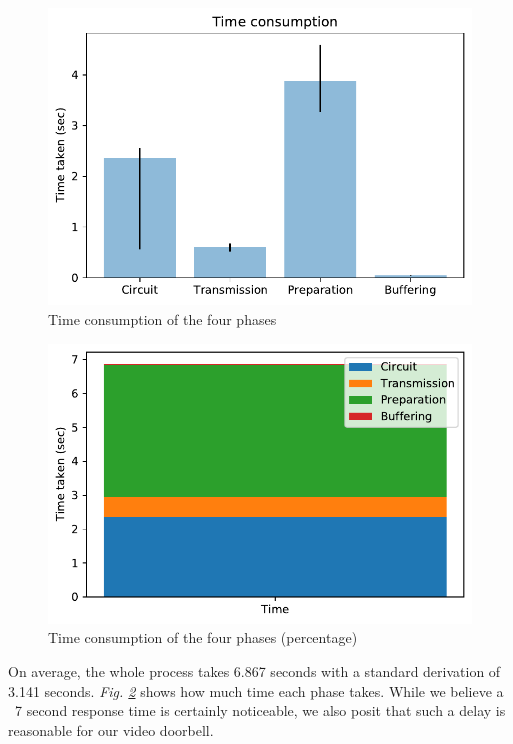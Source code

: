 \begin{figure}
	\includegraphics[width=\linewidth]{plot1.pdf}
	\caption{Time consumption of the four phases}
	\label{fig:timeconsumption}
\end{figure}

\begin{figure}
	\includegraphics[width=\linewidth]{plot2.pdf}
	\caption{Time consumption of the four phases (percentage)}
	\label{fig:timepercentage}
\end{figure}

On average, the whole process takes 6.867 seconds with a standard derivation of 3.141 seconds. \textit{Fig. \ref{fig:timepercentage}} shows how much time each phase takes. While we believe a ~7 second response time is certainly noticeable, we also posit that such a delay is reasonable for our video doorbell.


